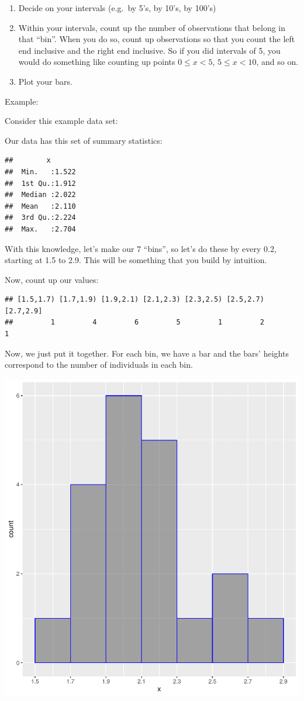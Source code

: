 \documentclass[
]{book}
\begin{document}
\begin{enumerate}
\def\labelenumi{\arabic{enumi}.}
\item
  Decide on your intervals (e.g.~by 5's, by 10's, by 100's)
\item
  Within your intervals, count up the number of observations that
  belong in that ``bin''. When you do so, count up observations so that
  you count the left end inclusive and the right end inclusive. So if
  you did intervals of 5, you would do something like counting up
  points \(0 \leq x < 5\), \(5 \leq x < 10\), and so on.
\item
  Plot your bars.
\end{enumerate}

Example:

Consider this example data set:

Our data has this set of summary statistics:

\begin{verbatim}
##        x        
##  Min.   :1.522  
##  1st Qu.:1.912  
##  Median :2.022  
##  Mean   :2.110  
##  3rd Qu.:2.224  
##  Max.   :2.704
\end{verbatim}

With this knowledge, let's make our 7 ``bins'', so let's do these by every
0.2, starting at 1.5 to 2.9. This will be something that you build by
intuition.

Now, count up our values:

\begin{verbatim}
## [1.5,1.7) [1.7,1.9) [1.9,2.1) [2.1,2.3) [2.3,2.5) [2.5,2.7) [2.7,2.9] 
##         1         4         6         5         1         2         1
\end{verbatim}

Now, we just put it together. For each bin, we have a bar and the bars'
heights correspond to the number of individuals in each bin.

\includegraphics{_main_files/figure-latex/unnamed-chunk-30-1.pdf}
\end{document}
